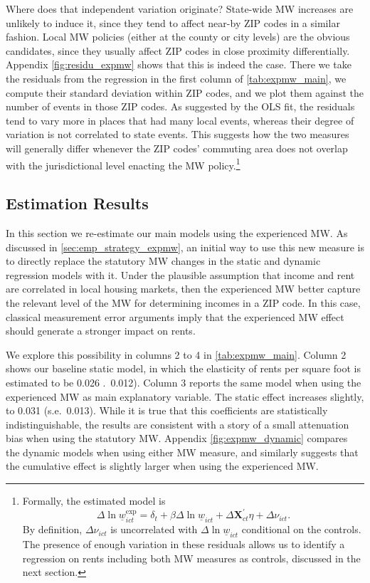 Where does that independent variation originate? State-wide MW increases are unlikely to 
induce it, since they tend to affect near-by ZIP codes in a similar fashion. Local MW policies 
(either at the county or city levels) are the obvious candidates, since they usually affect 
ZIP codes in close proximity differentially. Appendix \autoref{fig:residu_expmw} shows that 
this is indeed the case. There we take the residuals from the regression in the first column 
of \autoref{tab:expmw_main}, we compute their standard deviation within ZIP codes, and we plot 
them against the number of events in those ZIP codes. As suggested by the OLS fit, the residuals
tend to vary more in places that had many local events, whereas their degree of variation is not 
correlated to state events. This suggests how the two measures will generally differ whenever the 
ZIP codes' commuting area does not overlap with the jurisdictional level enacting the MW 
policy.\footnote{Formally, the estimated model is 
	$$ \Delta \ln \underline{w}_{ict}^{\text{exp}} = \delta_t 
				+ \beta \Delta \ln \underline{w}_{ict} + \Delta \mathbf{X}^{'}_{ct} \eta 
				+ \Delta \nu_{ict} . $$
	By definition, $\Delta \nu_{ict}$ is uncorrelated with $\Delta \ln \underline{w}_{ict}$ 
	conditional on the controls. The presence of enough variation in these residuals allows us
	to identify a regression on rents including both MW measures as controls, discussed in the
	next section.}


\subsection{Estimation Results}

In this section we re-estimate our main models using the experienced MW. As discussed in 
\autoref{sec:emp_strategy_expmw}, an initial way to use this new measure is to directly
replace the statutory MW changes in the static and dynamic regression models with it. 
Under the plausible assumption that income and rent are correlated in local housing 
markets, then the experienced MW better capture the relevant level of the MW for 
determining incomes in a ZIP code. In this case, classical measurement error arguments 
imply that the experienced MW effect should generate a stronger impact on rents. 

We explore this possibility in columns 2 to 4 in \autoref{tab:expmw_main}. Column 2 
shows our baseline static model, in which the elasticity of rents per square foot is 
estimated to be 0.026 .\ 0.012). Column 3 reports the same model when using the 
experienced MW as main explanatory variable. The static effect increases slightly, to 
0.031 (s.e.\ 0.013). While it is true that this coefficients are statistically 
indistinguishable, the results are consistent with a story of a small attenuation bias 
when using the statutory MW. Appendix \autoref{fig:expmw_dynamic} compares the dynamic 
models when using either MW measure, and similarly suggests that the cumulative effect 
is slightly larger when using the experienced MW.

